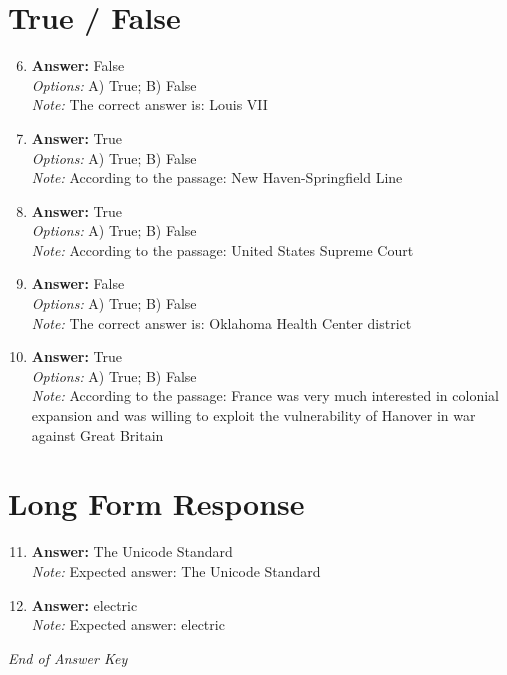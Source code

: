 \documentclass[12pt]{article}
\begin{document}
\section*{True / False}
\begin{enumerate}[label=\arabic*.]
\setcounter{enumi}{5}
\item \textbf{Answer:} False
\\ \textit{Options:} A) True; B) False
\\ \textit{Note:} The correct answer is: Louis VII
\item \textbf{Answer:} True
\\ \textit{Options:} A) True; B) False
\\ \textit{Note:} According to the passage: New Haven-Springfield Line
\item \textbf{Answer:} True
\\ \textit{Options:} A) True; B) False
\\ \textit{Note:} According to the passage: United States Supreme Court
\item \textbf{Answer:} False
\\ \textit{Options:} A) True; B) False
\\ \textit{Note:} The correct answer is: Oklahoma Health Center district
\item \textbf{Answer:} True
\\ \textit{Options:} A) True; B) False
\\ \textit{Note:} According to the passage: France was very much interested in colonial expansion and was willing to exploit the vulnerability of Hanover in war against Great Britain
\end{enumerate}

\section*{Long Form Response}
\begin{enumerate}[label=\arabic*.]
\setcounter{enumi}{10}
\item \textbf{Answer:} The Unicode Standard
\\ \textit{Note:} Expected answer: The Unicode Standard
\item \textbf{Answer:} electric
\\ \textit{Note:} Expected answer: electric
\end{enumerate}

\vfill
\noindent\textit{End of Answer Key}
\end{document}
